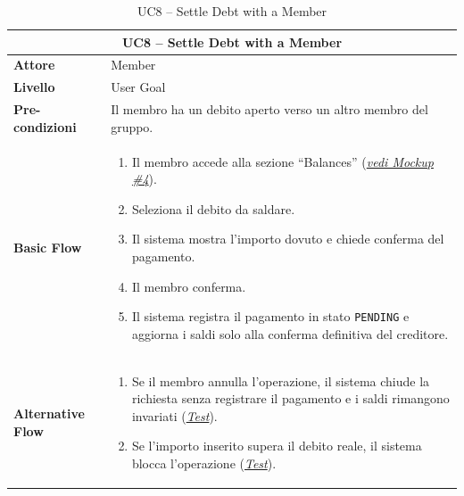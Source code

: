 \begin{table}[htbp]
    \centering
    \footnotesize
    \begin{tabularx}{\textwidth}{|l|X|}
        \hline
        \multicolumn{2}{|c|}{\textbf{UC8 -- Settle Debt with a Member}} \\
        \hline
        \textbf{Attore} & Member \\
        \hline
        \textbf{Livello} & User Goal \\
        \hline
        \textbf{Pre-condizioni} & Il membro ha un debito aperto verso un altro membro del gruppo. \\
        \hline
        \textbf{Basic Flow} & 
        \begin{enumerate}[leftmargin=*, nosep, topsep=3pt]
            \item Il membro accede alla sezione ``Balances'' (\hyperref[fig:balances]{\textit{vedi Mockup \#4}}).
            \item Seleziona il debito da saldare.
            \item Il sistema mostra l'importo dovuto e chiede conferma del pagamento.
            \item Il membro conferma.
            \item Il sistema registra il pagamento in stato \texttt{PENDING} e aggiorna i saldi solo alla conferma definitiva del creditore.
        \end{enumerate} \\
        \hline
        \textbf{Alternative Flow} & 
        \begin{enumerate}[label=4\alph*., leftmargin=*, nosep, topsep=3pt]
            \item Se il membro annulla l'operazione, il sistema chiude la richiesta senza registrare il pagamento e i saldi rimangono invariati (\hyperref[test:uc8_cancel]{\textit{Test}}).
            \item Se l'importo inserito supera il debito reale, il sistema blocca l'operazione (\hyperref[test:uc8_exceeds_debt]{\textit{Test}}).
        \end{enumerate} \\
        \hline
    \end{tabularx}
    \caption{UC8 -- Settle Debt with a Member}
    \label{tab:uc8}
\end{table}

